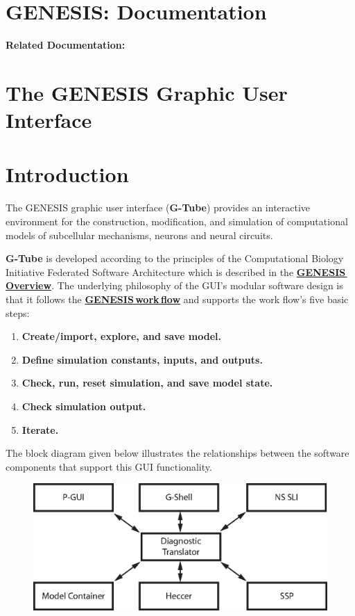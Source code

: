 \documentclass[12pt]{article}
\begin{document}
\section*{GENESIS: Documentation}

{\bf Related Documentation:}

\section*{The GENESIS Graphic User Interface}

\section*{Introduction}

The GENESIS graphic user interface ({\bf G-Tube}) provides an interactive environment for the construction, modification, and simulation of computational models of subcellular mechanisms, neurons and neural circuits.

{\bf G-Tube} is developed according to the principles of the Computational Biology Initiative Federated Software Architecture which is described in the \href{../genesis-overview/genesis-overview.tex}{\bf GENESIS\,Overview}. The underlying philosophy of the GUI's modular software design is that it follows the \href{../workflow-intro/workflow-intro.tex}{\bf GENESIS\,work\,flow} and supports the work flow's five basic steps:
\begin{enumerate}
\item {\bf Create/import, explore, and save model.}
\item {\bf Define simulation constants, inputs, and outputs.}
\item {\bf Check, run, reset simulation, and save model state.}
\item {\bf Check simulation output.}
\item {\bf Iterate.}
\end{enumerate}
The block diagram given below illustrates the relationships between the software components that support this GUI functionality.

\begin{figure}[h]
  \centering
\includegraphics[scale=0.6]{figures/gui-isolated.eps}
  \label{fig:df-1}
\end{figure}
\end{document}
